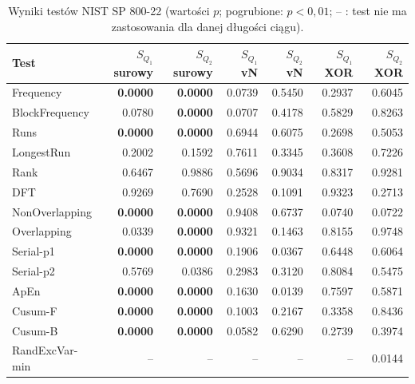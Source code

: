 \begin{table}[htbp]
\centering
\small
\begin{tabular}{lrrrrrr}
\toprule
Test & $S_{Q_1}$ surowy & $S_{Q_2}$ surowy & $S_{Q_1}$ vN & $S_{Q_2}$ vN & $S_{Q_1}$ XOR & $S_{Q_2}$ XOR \\
\midrule
Frequency & \textbf{0.0000} & \textbf{0.0000} & 0.0739 & 0.5450 & 0.2937 & 0.6045 \\
BlockFrequency & 0.0780 & \textbf{0.0000} & 0.0707 & 0.4178 & 0.5829 & 0.8263 \\
Runs & \textbf{0.0000} & \textbf{0.0000} & 0.6944 & 0.6075 & 0.2698 & 0.5053 \\
LongestRun & 0.2002 & 0.1592 & 0.7611 & 0.3345 & 0.3608 & 0.7226 \\
Rank & 0.6467 & 0.9886 & 0.5696 & 0.9034 & 0.8317 & 0.9281 \\
DFT & 0.9269 & 0.7690 & 0.2528 & 0.1091 & 0.9323 & 0.2713 \\
NonOverlapping & \textbf{0.0000} & \textbf{0.0000} & 0.9408 & 0.6737 & 0.0740 & 0.0722 \\
Overlapping & 0.0339 & \textbf{0.0000} & 0.9321 & 0.1463 & 0.8155 & 0.9748 \\
Serial-p1 & \textbf{0.0000} & \textbf{0.0000} & 0.1906 & 0.0367 & 0.6448 & 0.6064 \\
Serial-p2 & 0.5769 & 0.0386 & 0.2983 & 0.3120 & 0.8084 & 0.5475 \\
ApEn & \textbf{0.0000} & \textbf{0.0000} & 0.1630 & 0.0139 & 0.7597 & 0.5871 \\
Cusum-F & \textbf{0.0000} & \textbf{0.0000} & 0.1003 & 0.2167 & 0.3358 & 0.8436 \\
Cusum-B & \textbf{0.0000} & \textbf{0.0000} & 0.0582 & 0.6290 & 0.2739 & 0.3974 \\
RandExcVar-min & -- & -- & -- & -- & -- & 0.0144 \\
\bottomrule
\end{tabular}
\caption{Wyniki testów NIST SP 800-22 (wartości $p$; pogrubione: $p<0{,}01$; -- : test nie ma zastosowania dla danej długości ciągu).}
\label{tab:eqrng_nist}
\end{table}
